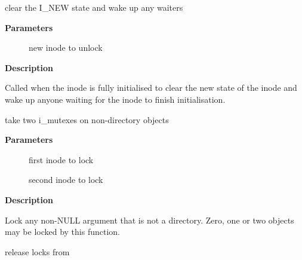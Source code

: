 \documentclass[a4paper,8pt,english]{sphinxmanual}
\begin{document}
\begin{fulllineitems}
\label{filesystems/index:c.unlock_new_inode}
clear the I\_NEW state and wake up any waiters

\end{fulllineitems}


\textbf{Parameters}
\begin{description}
\item[{}] \leavevmode
new inode to unlock

\end{description}

\textbf{Description}

Called when the inode is fully initialised to clear the new state of the
inode and wake up anyone waiting for the inode to finish initialisation.

\begin{fulllineitems}
\label{filesystems/index:c.lock_two_nondirectories}
take two i\_mutexes on non-directory objects

\end{fulllineitems}


\textbf{Parameters}
\begin{description}
\item[{}] \leavevmode
first inode to lock

\item[{}] \leavevmode
second inode to lock

\end{description}

\textbf{Description}

Lock any non-NULL argument that is not a directory.
Zero, one or two objects may be locked by this function.

\begin{fulllineitems}
\label{filesystems/index:c.unlock_two_nondirectories}
release locks from {\hyperref[filesystems/index:c.lock_two_nondirectories]{\emph{}}}

\end{fulllineitems}
\end{document}
